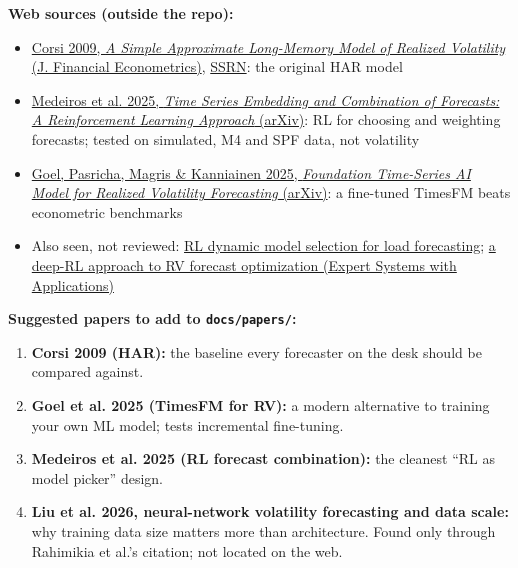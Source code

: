 \documentclass{article}
\begin{document}
\textbf{Web sources (outside the repo):}

\begin{itemize}

\item \href{https://academic.oup.com/jfec/article-abstract/7/2/174/856522}{Corsi 2009, \emph{A Simple Approximate Long-Memory Model of Realized Volatility} (J. Financial Econometrics)}, \href{https://papers.ssrn.com/sol3/papers.cfm?abstract_id=1365738}{SSRN}: the original HAR model

\item \href{https://arxiv.org/abs/2508.20795}{Medeiros et al. 2025, \emph{Time Series Embedding and Combination of Forecasts: A Reinforcement Learning Approach} (arXiv)}: RL for choosing and weighting forecasts; tested on simulated, M4 and SPF data, not volatility

\item \href{https://arxiv.org/abs/2505.11163}{Goel, Pasricha, Magris \& Kanniainen 2025, \emph{Foundation Time-Series AI Model for Realized Volatility Forecasting} (arXiv)}: a fine-tuned TimesFM beats econometric benchmarks

\item Also seen, not reviewed: \href{https://arxiv.org/pdf/1811.01846}{RL dynamic model selection for load forecasting}; \href{https://www.sciencedirect.com/science/article/abs/pii/S0957417423013829}{a deep-RL approach to RV forecast optimization (Expert Systems with Applications)}

\end{itemize}

\textbf{Suggested papers to add to \texttt{docs/\allowbreak{}papers/\allowbreak{}}:}

\begin{enumerate}

\item \textbf{Corsi 2009 (HAR):} the baseline every forecaster on the desk should be compared against.

\item \textbf{Goel et al. 2025 (TimesFM for RV):} a modern alternative to training your own ML model; tests incremental fine-tuning.

\item \textbf{Medeiros et al. 2025 (RL forecast combination):} the cleanest ``RL as model picker'' design.

\item \textbf{Liu et al. 2026, neural-network volatility forecasting and data scale:} why training data size matters more than architecture. Found only through Rahimikia et al.'s citation; not located on the web.

\end{enumerate}
\end{document}
